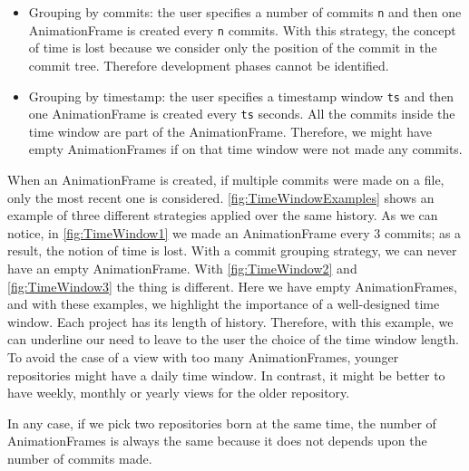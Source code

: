 \begin{itemize}
    \item{Grouping by commits}: the user specifies a number of commits \texttt{n} and then one AnimationFrame is created every \texttt{n} commits. With this strategy, the concept of time is lost because we consider only the position of the commit in the commit tree. Therefore development phases cannot be identified. 
    \item{Grouping by timestamp}: the user specifies a timestamp window \texttt{ts} and then one AnimationFrame is created every \texttt{ts} seconds. All the commits inside the time window are part of the AnimationFrame. Therefore, we might have empty AnimationFrames if on that time window were not made any commits. 
\end{itemize}

When an AnimationFrame is created, if multiple commits were made on a file, only the most recent one is considered. 
\autoref{fig:TimeWindowExamples} shows an example of three different strategies applied over the same history. As we can notice, in \autoref{fig:TimeWindow1} we made an AnimationFrame every 3 commits; as a result, the notion of time is lost. With a commit grouping strategy, we can never have an empty AnimationFrame. With  \autoref{fig:TimeWindow2} and \autoref{fig:TimeWindow3} the thing is different. Here we have empty AnimationFrames, and with these examples, we highlight the importance of a well-designed time window. Each project has its length of history. Therefore, with this example, we can underline our need to leave to the user the choice of the time window length. To avoid the case of a view with too many AnimationFrames, younger repositories might have a daily time window. In contrast, it might be better to have weekly, monthly or yearly views for the older repository. 

In any case, if we pick two repositories born at the same time, the number of AnimationFrames is always the same because it does not depends upon the number of commits made. 


